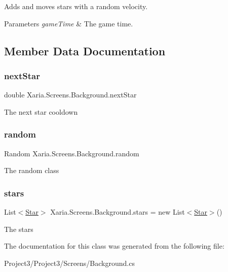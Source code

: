 Adds and moves stars with a random velocity. 


\begin{DoxyParams}{Parameters}
{\em game\+Time} & The game time.\\
\hline
\end{DoxyParams}


\subsection{Member Data Documentation}
\mbox{\label{classXaria_1_1Screens_1_1Background_a6ebc6e316dfe7749361c94d7ce128bc0}} 
\subsubsection{\texorpdfstring{next\+Star}{nextStar}}
{\footnotesize\ttfamily double Xaria.\+Screens.\+Background.\+next\+Star}



The next star cooldown 

\mbox{\label{classXaria_1_1Screens_1_1Background_a4b97051079197aa128807b05494efb60}} 
\subsubsection{\texorpdfstring{random}{random}}
{\footnotesize\ttfamily Random Xaria.\+Screens.\+Background.\+random\hspace{0.3cm}{\ttfamily [private]}}



The random class 

\mbox{\label{classXaria_1_1Screens_1_1Background_a3e8a751676da0427c800c6e68a35b2d1}} 
\subsubsection{\texorpdfstring{stars}{stars}}
{\footnotesize\ttfamily List$<$\hyperlink{classXaria_1_1Projectiles_1_1Star}{Star}$>$ Xaria.\+Screens.\+Background.\+stars = new List$<$\hyperlink{classXaria_1_1Projectiles_1_1Star}{Star}$>$()\hspace{0.3cm}{\ttfamily [private]}}



The stars 



The documentation for this class was generated from the following file\+:\begin{DoxyCompactItemize}
\item 
Project3/\+Project3/\+Screens/Background.\+cs\end{DoxyCompactItemize}
